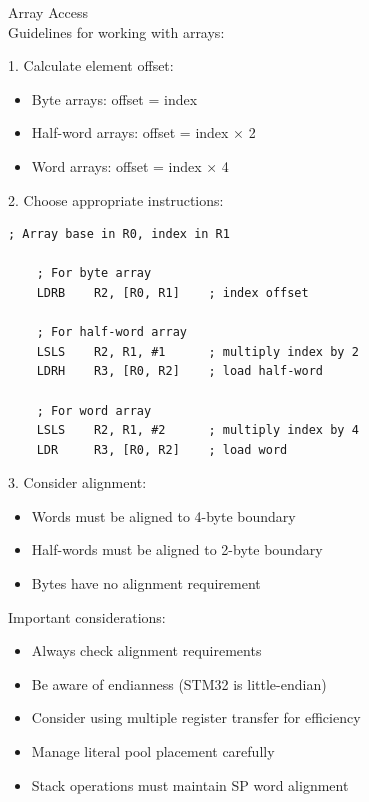 \begin{KR}{Array Access}\\
Guidelines for working with arrays:

1. Calculate element offset:
\begin{itemize}
  \item Byte arrays: offset = index
  \item Half-word arrays: offset = index × 2
  \item Word arrays: offset = index × 4
\end{itemize}

2. Choose appropriate instructions:
\begin{lstlisting}[language=armasm, style=basesmol]
    ; Array base in R0, index in R1
    
    ; For byte array
    LDRB    R2, [R0, R1]    ; index offset
    
    ; For half-word array
    LSLS    R2, R1, #1      ; multiply index by 2
    LDRH    R3, [R0, R2]    ; load half-word
    
    ; For word array
    LSLS    R2, R1, #2      ; multiply index by 4
    LDR     R3, [R0, R2]    ; load word
\end{lstlisting}

3. Consider alignment:
\begin{itemize}
  \item Words must be aligned to 4-byte boundary
  \item Half-words must be aligned to 2-byte boundary
  \item Bytes have no alignment requirement
\end{itemize}
\end{KR}

\begin{remark}
Important considerations:
\begin{itemize}
  \item Always check alignment requirements
  \item Be aware of endianness (STM32 is little-endian)
  \item Consider using multiple register transfer for efficiency
  \item Manage literal pool placement carefully
  \item Stack operations must maintain SP word alignment
\end{itemize}
\end{remark}


